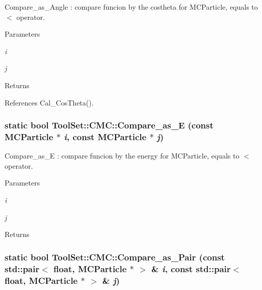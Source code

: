 Compare\_\-as\_\-Angle : compare funcion by the costheta for MCParticle, equals to $<$ operator. 
\begin{DoxyParams}{Parameters}
\item[{\em i}]\item[{\em j}]\end{DoxyParams}
\begin{DoxyReturn}{Returns}

\end{DoxyReturn}


References Cal\_\-CosTheta().\hypertarget{classToolSet_1_1CMC_a74a827b8a208cbf1ef83ee66b2a9dc04}{
\subsubsection[{Compare\_\-as\_\-E}]{\setlength{\rightskip}{0pt plus 5cm}static bool ToolSet::CMC::Compare\_\-as\_\-E (const MCParticle $\ast$ {\em i}, \/  const MCParticle $\ast$ {\em j})}}
\label{classToolSet_1_1CMC_a74a827b8a208cbf1ef83ee66b2a9dc04}


Compare\_\-as\_\-E : compare funcion by the energy for MCParticle, equals to $<$ operator. 
\begin{DoxyParams}{Parameters}
\item[{\em i}]\item[{\em j}]\end{DoxyParams}
\begin{DoxyReturn}{Returns}

\end{DoxyReturn}
\hypertarget{classToolSet_1_1CMC_a9840196a2fd81836dfc4118e68d7be38}{
\subsubsection[{Compare\_\-as\_\-Pair}]{\setlength{\rightskip}{0pt plus 5cm}static bool ToolSet::CMC::Compare\_\-as\_\-Pair (const std::pair$<$ float, MCParticle $\ast$ $>$ \& {\em i}, \/  const std::pair$<$ float, MCParticle $\ast$ $>$ \& {\em j})}}
\label{classToolSet_1_1CMC_a9840196a2fd81836dfc4118e68d7be38}


